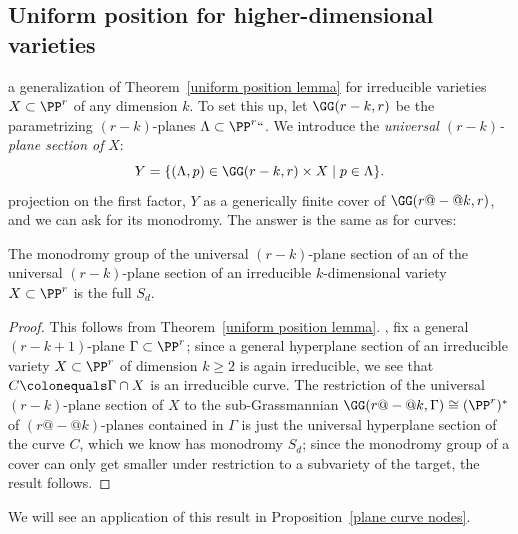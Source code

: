 \subsection*{Uniform position for higher-dimensional varieties}

a generalization of Theorem~\ref{uniform position lemma}
for irreducible varieties $X \subset \PP^r$ of any dimension $k$. To set
this up, let $\GG(r-k,r)$ be the 
%
parametrizing $(r-k)$-planes
$\Lambda \subset \PP^r` `$. We introduce the \emph{universal $(r-k)$-plane
section of} $X$:
$$
Y = \{ (\Lambda, p) \in \GG(r-k,r) \times X \mid p \in \Lambda \}.
$$
projection on the first factor, $Y$ 
 as a generically finite
cover of $\GG(r{@-@}k,r)$, and we can ask for its monodromy. The answer is
the same as for curves:


\begin{theorem}\label{higher dim uniform position lemma}
The monodromy group of the universal $(r-k)$-plane section of an
%
%
of the universal $(r-k)$-plane section of an
irreducible $k$-dimensional variety $X \subset \PP^r$ is the full
%
$S_d$.
\end{theorem}

\begin{proof}
This follows from Theorem~\ref{uniform position lemma}.
,
fix a general $(r-k+1)$-plane $\Gamma \subset \PP^r$; since a
general hyperplane section of an irreducible variety $X \subset \PP^r$
of dimension $k \geq 2$ is again irreducible, we see that $C \colonequals
\Gamma \cap X$ is an irreducible curve. The restriction of the universal
$(r-k)$-plane section of $X$ to the sub-Grassmannian $\GG(r{@-@}k, \Gamma)
\cong (\PP^r)^*$ of $(r{@-@}k)$-planes contained in $\Gamma$ is just the
universal hyperplane section of the curve $C$, which we know has monodromy
$S_d$; since the monodromy group of a cover can only get smaller under
restriction to a subvariety of the target, the result follows.
\end{proof}

We will see an application of this result in 
Proposition~\ref{plane curve nodes}.

